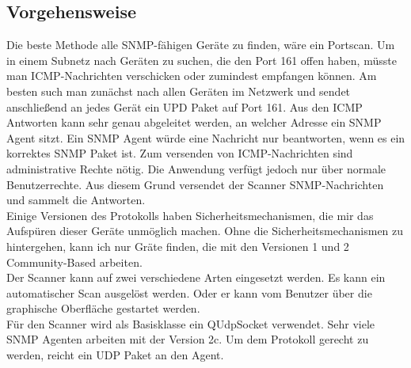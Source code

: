 \documentclass[11pt,a4paper]{article}
\begin{document}
\subsection{Vorgehensweise}
Die beste Methode alle SNMP-fähigen Geräte zu finden, wäre ein Portscan. Um in einem Subnetz nach Geräten zu suchen, die den Port 161 offen haben, müsste man ICMP-Nachrichten verschicken oder zumindest empfangen können. Am besten such man zunächst nach allen Geräten im Netzwerk und sendet anschließend an jedes Gerät ein UPD Paket auf Port 161. Aus den ICMP Antworten kann sehr genau abgeleitet werden, an welcher Adresse ein SNMP Agent sitzt. Ein SNMP Agent würde eine Nachricht nur beantworten, wenn es ein korrektes SNMP Paket ist. Zum versenden von ICMP-Nachrichten sind administrative Rechte nötig. Die Anwendung verfügt jedoch nur über normale Benutzerrechte. Aus diesem Grund versendet der Scanner SNMP-Nachrichten und sammelt die Antworten.\\
Einige Versionen des Protokolls haben Sicherheitsmechanismen, die mir das Aufspüren dieser Geräte unmöglich machen. Ohne die Sicherheitsmechanismen zu hintergehen, kann ich nur Gräte finden, die mit den Versionen 1 und 2 Community-Based arbeiten.\\
Der Scanner kann auf zwei verschiedene Arten eingesetzt werden. Es kann ein automatischer Scan ausgelöst werden. Oder er kann vom Benutzer über die graphische Oberfläche gestartet werden.\\
Für den Scanner wird als Basisklasse ein QUdpSocket verwendet. Sehr viele SNMP Agenten arbeiten mit der Version 2c. Um dem Protokoll gerecht zu werden, reicht ein UDP Paket an den Agent.\\
\end{document}
